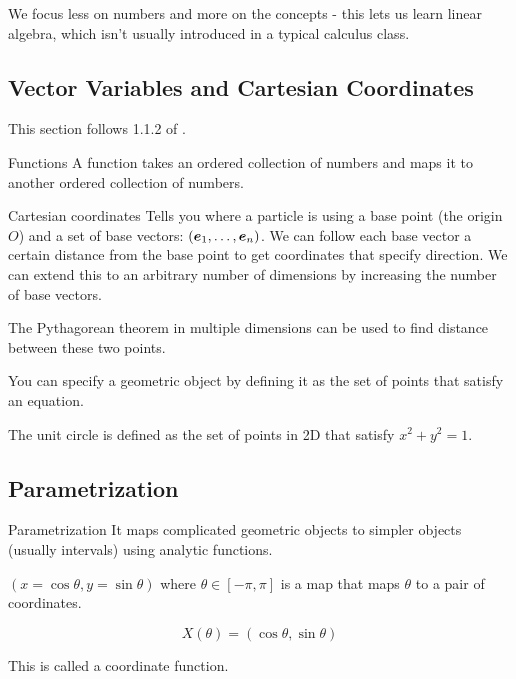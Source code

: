 \documentclass[11pt]{article}
\begin{document}
We focus less on numbers and more on the concepts - this lets us learn linear algebra, which isn't usually introduced in a typical calculus class.

\subsection{Vector Variables and  Cartesian Coordinates}

This section follows 1.1.2 of \cite{carlen}.

\begin{definition}{Functions}
  A function takes an ordered collection of numbers and maps it to another ordered collection of numbers.
\end{definition}

\begin{definition}{Cartesian coordinates}
  Tells you where a particle is using a base point (the origin $O$) and a set of base vectors: $\left ( \bm{e}_1, \dots, \bm{e}_n \right)$.
  We can follow each base vector a certain distance from the base point to get coordinates that specify direction.
  We can extend this to an arbitrary number of dimensions by increasing the number of base vectors.
\end{definition}

The Pythagorean theorem in multiple dimensions can be used to find distance between these two points.

You can specify a geometric object by defining it as the set of points that satisfy an equation.

\begin{example}{}
  The unit circle is defined as the set of points in 2D that satisfy $x^2 + y^2 = 1$.
\end{example}


\subsection{Parametrization}

\begin{definition}{Parametrization}
  It maps complicated geometric objects to simpler objects (usually intervals) using analytic functions.
\end{definition}

\begin{example}
  
  $(x = \cos{\theta}, y = \sin{\theta})$ where $\theta \in [-\pi, \pi]$ is a map that maps $\theta$ to a pair of coordinates.
  
  $$
  X(\theta) = (\cos \theta, \sin \theta)
  $$

  This is called a coordinate function.
\end{example}
\end{document}
